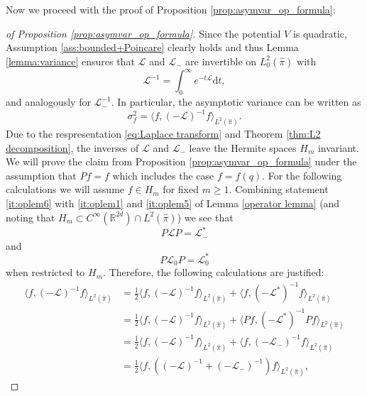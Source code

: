 Now we proceed with the proof of Proposition  \ref{prop:asymvar_op_formula}:
\begin{proof}[of Proposition \ref{prop:asymvar_op_formula}] Since the potential $V$ is quadratic, Assumption \ref{ass:bounded+Poincare} clearly holds and thus Lemma \ref{lemma:variance} ensures that $\mathcal{L}$ and $\mathcal{L}_{-}$ are invertible on $L^2_{0}(\widehat{\pi})$ with 
\begin{equation}
\label{eq:Laplace transform}
\mathcal{L}^{-1}=\int_0^\infty e^{-t\mathcal{L}}\mathrm{d}t,
\end{equation}
	and analogously for $\mathcal{L}_{-}^{-1}$.
	 In particular, the asymptotic variance can be written as 
	 \begin{equation*}
	 \sigma_{f}^{2}=\langle f,(-\mathcal{L})^{-1}f\rangle_{L^{2}(\widehat{\pi})}.
	 \end{equation*}
	  Due to the respresentation \eqref{eq:Laplace transform} and Theorem \ref{thm:L2 decomposition}, the inverses of $\mathcal{L}$ and $\mathcal{L}_{-}$ leave the Hermite spaces $H_m$ invariant. We will prove the claim from Proposition \ref{prop:asymvar_op_formula} under the assumption that $Pf=f$ which includes the case 
	$f=f(q)$. For the following calculations we will assume $f\in H_m$ for fixed $m \ge 1$. Combining statement \ref{it:oplem6} with \ref{it:oplem1} and \ref{it:oplem5} of Lemma \ref{operator lemma} (and noting that $H_m \subset C^\infty(\mathbb{R}^{2d})\cap L^2(\widehat{\pi})$) we see that 
	\begin{equation}
	\label{eq:PLPL-}
	P\mathcal{L}P=\mathcal{L}_{-}^{*}
	\end{equation}
	 and 
	 \begin{equation}
	 P\mathcal{L}_{0}P=\mathcal{L}_{0}^{*}
	 \end{equation}
	  when restricted to $H_m$. Therefore, the following calculations are justified:
	\begin{align*}
	\langle f,(-\mathcal{L})^{-1}f\rangle_{L^{2}(\widehat{\pi})} &=\frac{1}{2}\langle f,(-\mathcal{L})^{-1}f\rangle_{L^{2}(\widehat{\pi})}+\langle f,(-\mathcal{L}^{*})^{-1}f\rangle_{L^{2}(\widehat{\pi})}\\
	&=\frac{1}{2}\langle f,(-\mathcal{L})^{-1}f\rangle_{L^{2}(\widehat{\pi})}+\langle Pf,(-\mathcal{L}^{*})^{-1}Pf\rangle_{L^{2}(\widehat{\pi})}\\
	&=\frac{1}{2}\langle f,(-\mathcal{L})^{-1}f\rangle_{L^{2}(\widehat{\pi})}+\langle f,(-\mathcal{L}_{-})^{-1}f\rangle_{L^{2}(\widehat{\pi})}\\
	&=\frac{1}{2}\langle f,\left((-\mathcal{L})^{-1}+(-\mathcal{L}_{-})^{-1}\right)f\rangle_{L^{2}(\widehat{\pi})},

\end{align*}
\end{proof}
